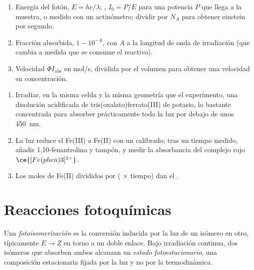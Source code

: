 \begin{method}\label{met:b3:photochemistry:photochemical-rate}
\begin{enumerate}
  \item Energía del fotón, $E = hc/\lambda$; , $I_0 = P/E$ para una potencia $P$ que llega a la
        muestra, o medido con un actinómetro; dividir por $N_A$ para obtener einstein por
        segundo.
  \item Fracción absorbida, $1 - 10^{-A}$, con $A$ a la longitud de onda de irradiación (que
        cambia a medida que se consume el reactivo).
  \item Velocidad $\Phi I_{\mathrm{abs}}$ en mol/s, dividida por el volumen para obtener una velocidad en concentración.
\end{enumerate}
\end{method}

\begin{method}\label{met:b3:photochemistry:actinometry}
\begin{enumerate}
  \item Irradiar, en la misma celda y la misma geometría que el experimento, una disolución
        acidificada de tris(oxalato)ferrato(III) de potasio, lo bastante concentrada para
        absorber prácticamente toda la luz por debajo de unos \qty{450}{nm}.
  \item La luz reduce el Fe(III) a Fe(II) con un  calibrado; tras un
        tiempo medido, añadir 1,10-fenantrolina y tampón, y medir la
        absorbancia del complejo rojo $\ce{[Fe(phen)3]^{2+}}$.
  \item Los moles de Fe(II) divididos por ( $\times$ tiempo) dan el .
\end{enumerate}
\end{method}

\section{Reacciones fotoquímicas}

\begin{definition}\label{def:b3:photochemistry:photoisomerisation}
Una \emph{fotoisomerización} es la conversión inducida por la luz
de un isómero en otro, típicamente $E \to Z$ en torno a un doble enlace. Bajo
irradiación continua, dos isómeros que absorben ambos alcanzan un
\emph{estado fotoestacionario}, una composición estacionaria
fijada por la luz y no por la termodinámica.
\end{definition}

